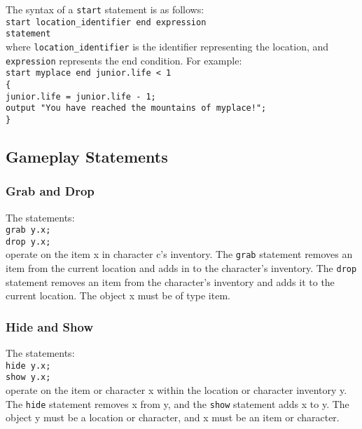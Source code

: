 \documentclass[12pt]{article}
\begin{document}
\noindent The syntax of a \texttt{start} statement is as follows: \\

\texttt{start location\_identifier end expression} \\
\indent \indent \texttt{statement} \\

\noindent where \texttt{location\_identifier} is the identifier representing the location, and \texttt{expression} represents the end condition.  For example: \\

\texttt{start myplace end junior.life < 1} \\
\indent \texttt{\{} \\
\indent \indent \texttt{junior.life = junior.life - 1;} \\
\indent \indent \texttt{output "You have reached the mountains of myplace!";} \\
\indent \texttt{\}}

\subsection{Gameplay Statements}
\subsubsection{Grab and Drop}
The statements: \\

\texttt{grab y.x;} \\
\indent \texttt{drop y.x;} \\

\noindent operate on the item x in character c's inventory.  The \texttt{grab} statement removes an item from the current location and adds in to the character's inventory.  The \texttt{drop} statement removes an item from the character's inventory and adds it to the current location.  The object x must be of type item.

\subsubsection{Hide and Show}
The statements:\\

\texttt{hide y.x;} \\
\indent \texttt{show y.x;} \\

\noindent operate on the item or character x within the location or character inventory y.  The \texttt{hide} statement removes x from y, and the \texttt{show} statement adds x to y.  The object y must be a location or character, and x must be an item or character.
\end{document}
